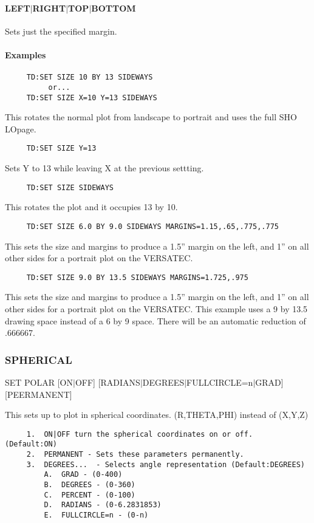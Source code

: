 \paragraph{LEFT$|$RIGHT$|$TOP$|$BOTTOM}
Sets just the specified margin.  
\paragraph{Examples}
\begin{verbatim}
     TD:SET SIZE 10 BY 13 SIDEWAYS 
          or...  
     TD:SET SIZE X=10 Y=13 SIDEWAYS 
\end{verbatim}
This  rotates the normal plot from landscape to portrait and uses the
full SHO LOpage.  
\begin{verbatim}
     TD:SET SIZE Y=13 
\end{verbatim}
Sets Y to 13 while leaving X at the previous settting.  
\begin{verbatim}
     TD:SET SIZE SIDEWAYS 
\end{verbatim}
This rotates the plot and it occupies 13 by 10.  
\begin{verbatim}
     TD:SET SIZE 6.0 BY 9.0 SIDEWAYS MARGINS=1.15,.65,.775,.775 
\end{verbatim}
This  sets the size and margins to produce a 1.5'' margin on the left,
and 1'' on all other sides for a portrait plot on the VERSATEC.  
\begin{verbatim}
     TD:SET SIZE 9.0 BY 13.5 SIDEWAYS MARGINS=1.725,.975 
\end{verbatim}
This  sets the size and margins to produce a 1.5'' margin on the left,
and 1'' on all other sides for a portrait plot on the VERSATEC.   This
example  uses  a  9  by 13.5 drawing space instead of a 6 by 9 space.
There will be an automatic reduction of .666667.  
\subsubsection{SPHERICAL}
SET POLAR [ON$|$OFF] [RADIANS$|$DEGREES$|$FULLCIRCLE=n$|$GRAD] [PEERMANENT] 

This  sets  up to plot in spherical coordinates.  (R,THETA,PHI) instead
of (X,Y,Z) 
\begin{verbatim}
     1.  ON|OFF turn the spherical coordinates on or off.  (Default:ON) 
     2.  PERMANENT - Sets these parameters permanently.  
     3.  DEGREES...  - Selects angle representation (Default:DEGREES) 
         A.  GRAD - (0-400) 
         B.  DEGREES - (0-360) 
         C.  PERCENT - (0-100) 
         D.  RADIANS - (0-6.2831853) 
         E.  FULLCIRCLE=n - (0-n) 
\end{verbatim}

